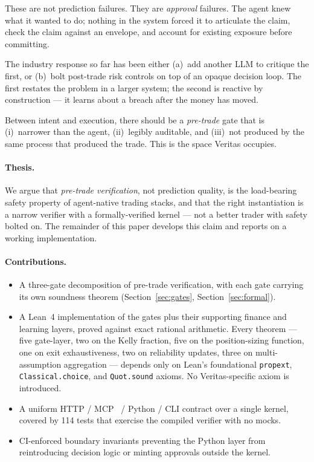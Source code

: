 \documentclass[11pt, a4paper]{article}
\begin{document}
These are not prediction failures. They are \emph{approval} failures. The
agent knew what it wanted to do; nothing in the system forced it to
articulate the claim, check the claim against an envelope, and account for
existing exposure before committing.

The industry response so far has been either (a)~add another LLM to critique
the first, or (b)~bolt post-trade risk controls on top of an opaque
decision loop. The first restates the problem in a larger system; the
second is reactive by construction --- it learns about a breach after the
money has moved.

Between intent and execution, there should be a \emph{pre-trade} gate that
is (i)~narrower than the agent, (ii)~legibly auditable, and (iii)~not
produced by the same process that produced the trade. This is the space
Veritas occupies.

\paragraph{Thesis.}
We argue that \emph{pre-trade verification}, not prediction quality, is
the load-bearing safety property of agent-native trading stacks, and
that the right instantiation is a narrow verifier with a
formally-verified kernel --- not a better trader with safety bolted on.
The remainder of this paper develops this claim and reports on a working
implementation.

\paragraph{Contributions.}
\begin{itemize}[leftmargin=1.5em, itemsep=2pt, topsep=2pt]
\item A three-gate decomposition of pre-trade verification, with each
      gate carrying its own soundness theorem (Section~\ref{sec:gates},
      Section~\ref{sec:formal}).
\item A Lean~4 implementation of the gates plus their supporting
      finance and learning layers, proved against exact rational
      arithmetic. Every theorem --- five gate-layer, two on the Kelly
      fraction, five on the position-sizing function, one on exit
      exhaustiveness, two on reliability updates, three on multi-
      assumption aggregation --- depends only on Lean's foundational
      \texttt{propext}, \texttt{Classical.choice}, and \texttt{Quot.sound}
      axioms. No Veritas-specific axiom is introduced.
\item A uniform HTTP / MCP~\cite{mcp} / Python / CLI contract over a
      single kernel, covered by 114 tests that exercise the compiled
      verifier with no mocks.
\item CI-enforced boundary invariants preventing the Python layer from
      reintroducing decision logic or minting approvals outside the
      kernel.
\end{itemize}
\end{document}
